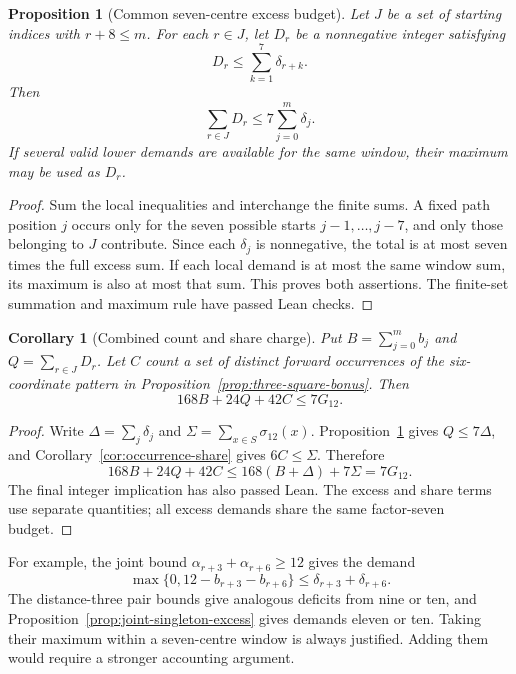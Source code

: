 \documentclass[11pt,a4paper]{article}
\newtheorem{proposition}[theorem]{Proposition}
\newtheorem{corollary}[theorem]{Corollary}
\theoremstyle{definition}
\theoremstyle{remark}
\begin{document}
\begin{proposition}[Common seven-centre excess budget]\label{prop:common-budget}
Let $J$ be a set of starting indices with $r+8\le m$. For each $r\in J$, let $D_r$ be a nonnegative integer satisfying
\[
D_r\le\sum_{k=1}^{7}\delta_{r+k}.
\]
Then
\[
\sum_{r\in J}D_r\le7\sum_{j=0}^{m}\delta_j.
\]
If several valid lower demands are available for the same window, their maximum may be used as $D_r$.
\end{proposition}
\begin{proof}
Sum the local inequalities and interchange the finite sums. A fixed path position $j$ occurs only for the seven possible starts $j-1,\ldots,j-7$, and only those belonging to $J$ contribute. Since each $\delta_j$ is nonnegative, the total is at most seven times the full excess sum. If each local demand is at most the same window sum, its maximum is also at most that sum. This proves both assertions. The finite-set summation and maximum rule have passed Lean checks.
\end{proof}

\begin{corollary}[Combined count and share charge]\label{cor:combined-budget}
Put $B=\sum_{j=0}^{m}b_j$ and $Q=\sum_{r\in J}D_r$. Let $C$ count a set of distinct forward occurrences of the six-coordinate pattern in Proposition~\ref{prop:three-square-bonus}. Then
\begin{equation}\label{eq:common-budget-charge}
168B+24Q+42C\le7G_{12}.
\end{equation}
\end{corollary}
\begin{proof}
Write $\Delta=\sum_j\delta_j$ and $\Sigma=\sum_{x\in S}\sigma_{12}(x)$. Proposition~\ref{prop:common-budget} gives $Q\le7\Delta$, and Corollary~\ref{cor:occurrence-share} gives $6C\le\Sigma$. Therefore
\[
168B+24Q+42C
\le168(B+\Delta)+7\Sigma
=7G_{12}.
\]
The final integer implication has also passed Lean. The excess and share terms use separate quantities; all excess demands share the same factor-seven budget.
\end{proof}

For example, the joint bound $\alpha_{r+3}+\alpha_{r+6}\ge12$ gives the demand
\[
\max\{0,12-b_{r+3}-b_{r+6}\}
\le\delta_{r+3}+\delta_{r+6}.
\]
The distance-three pair bounds give analogous deficits from nine or ten, and Proposition~\ref{prop:joint-singleton-excess} gives demands eleven or ten. Taking their maximum within a seven-centre window is always justified. Adding them would require a stronger accounting argument.
\end{document}
